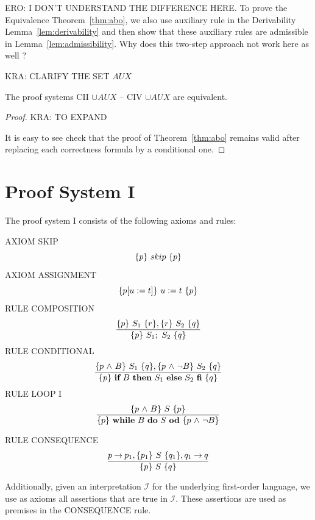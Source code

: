 \documentclass[runningheads]{llncs}       %
\newcommand{\AUX}{\mathit{AUX}}
\begin{document}
ERO: I DON'T UNDERSTAND THE DIFFERENCE HERE. To prove the Equivalence Theorem~\ref{thm:abo}, we also use auxiliary
rule in the Derivability Lemma~\ref{lem:derivability} and then show that
these auxiliary rules are admissible in Lemma~\ref{lem:admissibility}.
Why does this two-step approach not work here as well ?


KRA: CLARIFY THE SET $\AUX$

\begin{theorem} \label{thm:main2}
  The proof systems CII $\cup \AUX$ -- CIV $\cup \AUX$  are equivalent.  
\end{theorem}

\begin{proof}
KRA:  TO EXPAND

  It is easy to see check that the proof of Theorem~\ref{thm:abo} remains valid after replacing each
  correctness formula by a conditional one.
\HB
\end{proof}





\appendix

\section{Proof System I}
\label{sec:I}

The proof system I consists of the following axioms and rules:
\VV

\NI
AXIOM \label{rul:skip} SKIP
\[ \mbox{$\{{p}\}\ {skip}\ \{{p}\}$} \]
%
\NI
AXIOM \label{rul:assi} ASSIGNMENT
\[ \mbox{$\{{p[u:=t]}\}\ {u:=t}\ \{{p}\}$} \]
%
\NI
RULE \label{rul:comp} COMPOSITION
\[ \frac{ \mbox{$\{{p}\}\ {S_1}\ \{{r}\}$}, \mbox{$\{{r}\}\ {S_2}\ \{{q}\}$}                }
        { \mbox{$\{{p}\}\ {S_1;\ S_2}\ \{{q}\}$}                          }\]
%
\NI
RULE \label{rul:cond} CONDITIONAL
\[ \frac{ \mbox{$\{{p \mbox{$\ \wedge\ $} B}\}\ {S_1}\ \{{q}\}$}, \mbox{$\{{p \mbox{$\ \wedge\ $} \neg B}\}\ {S_2}\ \{{q}\}$}         }
        { \mbox{$\{{p}\}\ {\mbox{$\mbox{{\bf if}\ } {B} \mbox{\ {\bf then}\ } {S_1} \mbox{\ {\bf else}\ } {S_2}\ \mbox{{\bf fi}}$}}\ \{{q}\}$}                          }\]
%
\NI
RULE \label{rul:loop} LOOP I
\[ \frac{ \mbox{$\{{p \mbox{$\ \wedge\ $} B}\}\ {S}\ \{{p}\}$}                             }
        { \mbox{$\{{p}\}\ {\mbox{$\mbox{{\bf while}\ } {B}\ \mbox{{\bf do}\ } {S}\ \mbox{{\bf od}}$}}\ \{{p \mbox{$\ \wedge\ $} \neg B}\}$}               }\]
%

\NI
RULE \label{rul:cons} CONSEQUENCE
\[ \frac{ p \mbox{$\:\rightarrow\:$} p_1, \mbox{$\{{p_1}\}\ {S}\ \{{q_1}\}$}, q_1 \mbox{$\:\rightarrow\:$} q        }
        { \mbox{$\{{p}\}\ {S}\ \{{q}\}$}                                  }\]
%

Additionally, given an interpretation $\mathcal{I}$ for the underlying first-order language, 
we use as axioms all assertions that are true in $\mathcal{I}$. 
These assertions are used as premises in the CONSEQUENCE rule. 
\end{document}
